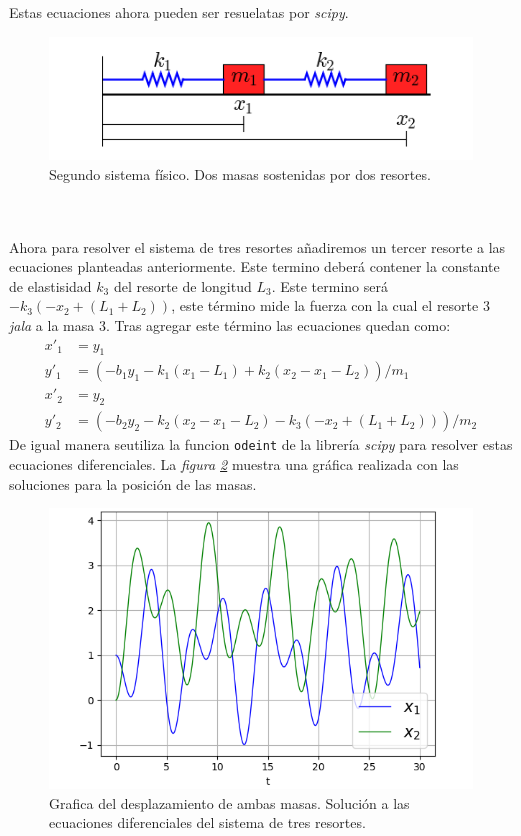 \documentclass[12pt]{article}
\begin{document}
Estas ecuaciones ahora pueden ser resuelatas por \textit{scipy}.
\begin{figure}
    \centering
    \includegraphics[scale = 0.8]{prob_simple.png}
    \caption{Segundo sistema f\'isico. Dos masas sostenidas por dos resortes.}
    \label{fig:ejemplo}
\end{figure} \\
\\
Ahora para resolver el sistema de tres resortes añadiremos un tercer resorte a las ecuaciones planteadas anteriormente. Este termino deber\'a contener la constante de elastisidad $k_3$ del resorte de longitud $L_3$. Este termino ser\'a $-k_3(-x_2 + (L_1+ L_2))$, este t\'ermino mide la fuerza con la cual el resorte 3 \textit{jala} a la masa 3. Tras agregar este t\'ermino las ecuaciones quedan como:
\begin{equation*}
    \begin{split}
        x'_1&=y_1 \\
        y'_1&=(-b_1y_1-k_1(x_1-L_1)+k_2(x_2-x_1-L_2 ))/m_1\\
        x'_2&=y_2\\
        y'_2&=(-b_2y_2-k_2(x_2-x_1-L_2) - k_3(-x_2 + (L_1+ L_2)))/m_2
    \end{split}
\end{equation*}
De igual manera seutiliza la funcion \texttt{odeint} de la librer\'ia \textit{scipy} para resolver estas ecuaciones diferenciales. La \textit{figura \ref{fig:solucion}} muestra una gr\'afica realizada con las soluciones para la posici\'on de las masas.
\begin{figure}
    \centering
    \includegraphics[scale = 0.8]{two_springs.png}
    \caption{Grafica del desplazamiento de ambas masas. Soluci\'on a las ecuaciones diferenciales del sistema de tres resortes.}
    \label{fig:solucion}
\end{figure}
\end{document}

